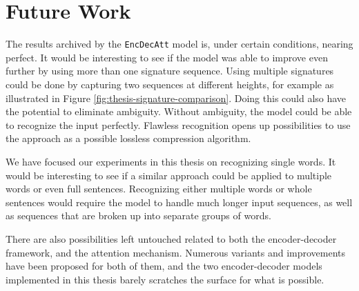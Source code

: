 
\section{Future Work}
\label{sec:future_work}
The results archived by the {\tt EncDecAtt} model is, under certain conditions, nearing perfect. It would be interesting to see if the model was able to improve even further by using more than one signature sequence. Using multiple signatures could be done by capturing two sequences at different heights, for example as illustrated in Figure \ref{fig:thesis-signature-comparison}. Doing this could also have the potential to eliminate ambiguity. Without ambiguity, the model could be able to recognize the input perfectly. Flawless recognition opens up possibilities to use the approach as a possible lossless compression algorithm.

We have focused our experiments in this thesis on recognizing single words. It would be interesting to see if a similar approach could be applied to multiple words or even full sentences. Recognizing either multiple words or whole sentences would require the model to handle much longer input sequences, as well as sequences that are broken up into separate groups of words.

There are also possibilities left untouched related to both the encoder-decoder framework, and the attention mechanism. Numerous variants and improvements have been proposed for both of them, and the two encoder-decoder models implemented in this thesis barely scratches the surface for what is possible.